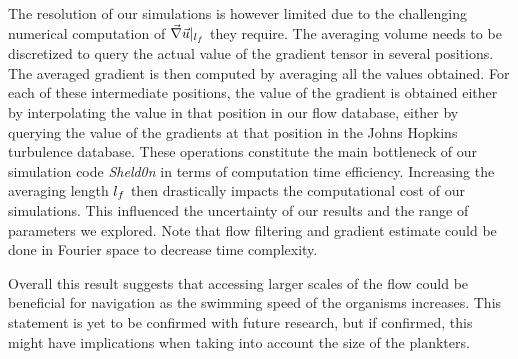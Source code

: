 
The resolution of our simulations is however limited due to the challenging numerical computation of $\vec{\nabla} \vec{u} |_{l_{f}}$ they require.
The averaging volume needs to be discretized to query the actual value of the gradient tensor in several positions.
The averaged gradient is then computed by averaging all the values obtained.
For each of these intermediate positions, the value of the gradient is obtained either by interpolating the value in that position in our flow database, either by querying the value of the gradients at that position in the Johns Hopkins turbulence database.
These operations constitute the main bottleneck of our simulation code \textit{Sheld0n} in terms of computation time efficiency.
Increasing the averaging length $l_{f}$ then drastically impacts the computational cost of our simulations.
This influenced the uncertainty of our results and the range of parameters we explored.
Note that flow filtering and gradient estimate could be done in Fourier space to decrease time complexity.

Overall this result suggests that accessing larger scales of the flow could be beneficial for navigation as the swimming speed of the organisms increases.
This statement is yet to be confirmed with future research, but if confirmed, this might have implications when taking into account the size of the plankters.


